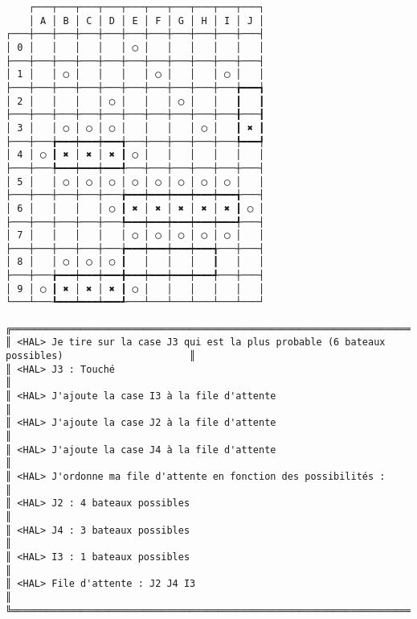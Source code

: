 {\scriptsize
\begin{verbatim}
    ┌───┬───┬───┬───┬───┬───┬───┬───┬───┬───┐
    │ A │ B │ C │ D │ E │ F │ G │ H │ I │ J │
┌───┼───┼───┼───┼───┼───┼───┼───┼───┼───┼───┤
│ 0 │   │   │   │   │ ◯ │   │   │   │   │   │
├───┼───┼───┼───┼───┼───┼───┼───┼───┼───┼───┤
│ 1 │   │ ◯ │   │   │   │ ◯ │   │   │ ◯ │   │
├───┼───┼───┼───┼───┼───┼───┼───┼───┼───╆━━━┪
│ 2 │   │   │   │ ◯ │   │   │ ◯ │   │   ┃   ┃
├───┼───┼───┼───┼───┼───┼───┼───┼───┼───╂───┨
│ 3 │   │ ◯ │ ◯ │ ◯ │   │   │   │ ◯ │   ┃ ✖ ┃
├───┼───╆━━━┿━━━┿━━━╅───┼───┼───┼───┼───╄━━━┩
│ 4 │ ◯ ┃ ✖ │ ✖ │ ✖ ┃ ◯ │   │   │   │   │   │
├───┼───╄━━━┿━━━┿━━━╃───┼───┼───┼───┼───┼───┤
│ 5 │   │ ◯ │ ◯ │ ◯ │ ◯ │ ◯ │ ◯ │ ◯ │ ◯ │   │
├───┼───┼───┼───┼───╆━━━┿━━━┿━━━┿━━━┿━━━╅───┤
│ 6 │   │   │   │ ◯ ┃ ✖ │ ✖ │ ✖ │ ✖ │ ✖ ┃ ◯ │
├───┼───┼───┼───┼───╄━━━┿━━━┿━━━┿━━━┿━━━╃───┤
│ 7 │   │   │   │   │ ◯ │ ◯ │ ◯ │ ◯ │ ◯ │   │
├───┼───┼───┼───┼───╆━━━┿━━━┿━━━┿━━━╅───┼───┤
│ 8 │   │ ◯ │ ◯ │ ◯ ┃   │   │   │   ┃   │   │
├───┼───╆━━━┿━━━┿━━━╋━━━┿━━━┿━━━┿━━━╃───┼───┤
│ 9 │ ◯ ┃ ✖ │ ✖ │ ✖ ┃ ◯ │   │   │   │   │   │
└───┴───┺━━━┷━━━┷━━━┹───┴───┴───┴───┴───┴───┘

╔══════════════════════════════════════════════════════════════════════════════════════════════════╗
║ <HAL> Je tire sur la case J3 qui est la plus probable (6 bateaux possibles)                      ║
║ <HAL> J3 : Touché                                                                                ║
║ <HAL> J'ajoute la case I3 à la file d'attente                                                    ║
║ <HAL> J'ajoute la case J2 à la file d'attente                                                    ║
║ <HAL> J'ajoute la case J4 à la file d'attente                                                    ║
║ <HAL> J'ordonne ma file d'attente en fonction des possibilités :                                 ║
║ <HAL> J2 : 4 bateaux possibles                                                                   ║
║ <HAL> J4 : 3 bateaux possibles                                                                   ║
║ <HAL> I3 : 1 bateaux possibles                                                                   ║
║ <HAL> File d'attente : J2 J4 I3                                                                  ║
╚══════════════════════════════════════════════════════════════════════════════════════════════════╝
\end{verbatim}}
\newpage

